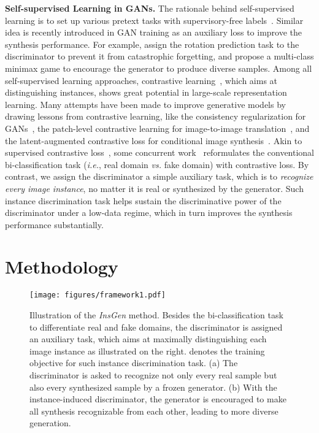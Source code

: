 \documentclass{article}
\begin{document}
\textbf{Self-supervised Learning in GANs.}
The rationale behind self-supervised learning is to set up various pretext tasks with supervisory-free labels~\cite{donahue2019large, chen2020generative, xu2021generative, zhang2016colorful,doersch2015unsupervised, oord2018representation, pathak2016context, yang2021insloc, pathak2016context, gidaris2018unsupervised, noroozi2016unsupervised, pathak2017learning}.
Similar idea is recently introduced in GAN training as an auxiliary loss to improve the synthesis performance.
For example, \citet{chen2019self} assign the rotation prediction task to the discriminator to prevent it from catastrophic forgetting, and \citet{tran2019self} propose a multi-class minimax game to encourage the generator to produce diverse samples.
Among all self-supervised learning approaches, contrastive learning~\cite{wu2018unsupervised, he2019momentum, chen2020simple, henaff2020data, bachman2019learning}, which aims at distinguishing instances, shows great potential in large-scale representation learning.
Many attempts have been made to improve generative models by drawing lessons from contrastive learning, like the consistency regularization for GANs~\cite{zhang2019consistency, zhao2020improved}, the patch-level contrastive learning for image-to-image translation~\cite{park2020contrastive}, and the latent-augmented contrastive loss for conditional image synthesis~\cite{liu2021divco}.
Akin to supervised contrastive loss~\cite{khosla2020supervised}, some concurrent work~\cite{jeong2021training, kang2020contragan, yu2021dual} reformulates the conventional bi-classification task (\textit{i.e.}, real domain \textit{vs.} fake domain) with contrastive loss.
By contrast, we assign the discriminator a simple auxiliary task, which is to \textit{recognize every image instance}, no matter it is real or synthesized by the generator.
Such instance discrimination task helps sustain the discriminative power of the discriminator under a low-data regime, which in turn improves the synthesis performance substantially.


\section{Methodology}\label{sec:method}


\begin{figure}[t]
	\centering
	\texttt{[image: figures/framework1.pdf]}
	\vspace{-15pt}
	\caption{
	    Illustration of the \textit{InsGen} method.
Besides the bi-classification task to differentiate real and fake domains, the discriminator is assigned an auxiliary task, which aims at maximally distinguishing each image instance as illustrated on the right.
 denotes the training objective for such instance discrimination task.
(a) The discriminator is asked to recognize not only every real sample  but also every synthesized sample  by a frozen generator.
(b) With the instance-induced discriminator, the generator is encouraged to make all synthesis recognizable from each other, leading to more diverse generation.
	}
    \label{fig:framework}
    \vspace{0pt}
\end{figure}
\end{document}
